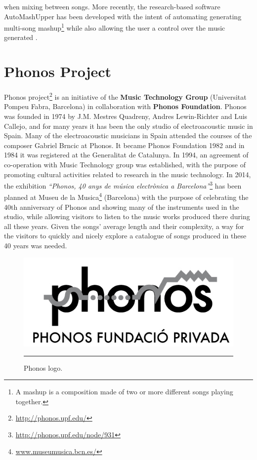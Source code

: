 when mixing between songs. More recently, the research-based software AutoMashUpper has been developed with the intent of automating generating multi-song mashup\footnote{A mashup is a composition made of two or more different songs playing together.} while also allowing the user a control over the music generated \cite{automash14}. 


\section{Phonos Project}
Phonos project\footnote{\url{http://phonos.upf.edu/}} is an initiative of the \textbf{Music Technology Group} (Universitat Pompeu Fabra, Barcelona) in collaboration with \textbf{Phonos Foundation}. Phonos was founded in 1974 by J.M. Mestres Quadreny, Andres Lewin-Richter and Luis Callejo, and for many years it has been the only studio of electroacoustic music in Spain. Many of the electroacoustic musicians in Spain attended the courses of the composer Gabriel Brncic at Phonos. It became Phonos Foundation 1982 and in 1984 it was registered at the Generalitat de Catalunya. In 1994, an agreement of co-operation with Music Technology group was established, with the purpose of promoting cultural activities related to research in the music technology. 
In 2014, the exhibition \textit{``Phonos, 40 anys de música electrònica a Barcelona''}\footnote{\url{http://phonos.upf.edu/node/931}} has been planned at Museu de la Musica\footnote{\url{www.museumusica.bcn.es/}} (Barcelona) with the purpose of celebrating the 40th anniversary of Phonos and showing many of the instruments used in the studio, while allowing visitors to listen to the music works produced there during all these years. Given the songs' average length and their complexity, a way for the visitors to quickly and nicely explore a catalogue of songs produced in these 40 years was needed.

\begin{figure}[htbp]
  \centering
    \includegraphics{Figures/phonos.png}
    \rule{15em}{0.5pt}
  \caption[Phonos]{Phonos logo.}
  \label{fig:Phonos}
\end{figure}


